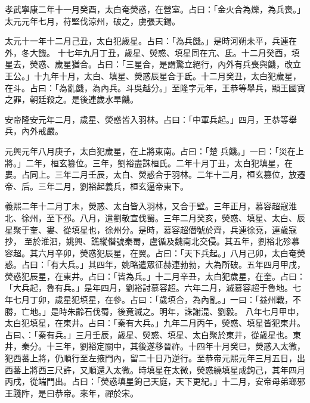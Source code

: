 \begin{pinyinscope}
 孝武寧康二年十一月癸酉，太白奄熒惑，在營室。占曰：「金火合為爍，為兵喪。」太元元年七月，苻堅伐涼州，破之，虜張天錫。



 太元十一年十二月己丑，太白犯歲星。占曰：「為兵饑。」是時河朔未平，兵連在外，冬大饑。
 十七年九月丁丑，歲星、熒惑、填星同在亢、氐。十二月癸酉，填星去，熒惑、歲星猶合。占曰：「三星合，是謂驚立絕行，內外有兵喪與饑，改立王公。」十九年十月，太白、填星、熒惑辰星合于氐。十二月癸丑，太白犯歲星，在斗。占曰：「為亂饑，為內兵。斗吳越分。」至隆字元年，王恭等舉兵，顯王國寶之罪，朝廷殺之。是後連歲水旱饑。



 安帝隆安元年二月，歲星、熒惑皆入羽林。占曰：「中軍兵起。」四月，王恭等舉兵，內外戒嚴。



 元興元年八月庚子，太白犯歲星，在上將東南。占曰：「楚
 兵饑。」一曰：「災在上將。」二年，桓玄篡位。三年，劉裕盡誅桓氏。二年十月丁丑，太白犯填星，在婁。占同上。三年二月壬辰，太白、熒惑合于羽林。二年十二月，桓玄篡位，放遷帝、后。三年二月，劉裕起義兵，桓玄逼帝東下。



 義熙二年十二月丁未，熒惑、太白皆入羽林，又合于壁。三年正月，慕容超寇淮北、徐州，至下邳。八月，遣劉敬宣伐蜀。三年二月癸亥，熒惑、填星、太白、辰星聚于奎、婁、從填星也，徐州分。是時，慕容超僭號於齊，兵連徐兗，連歲寇抄，
 至於淮泗，姚興、譙縱僭號秦蜀，盧循及魏南北交侵。其五年，劉裕北殄慕容超。其六月辛卯，熒惑犯辰星，在翼。占曰：「天下兵起。」八月己卯，太白奄熒惑。占曰：「有大兵。」其四年，姚略遣眾征赫連勃勃，大為所破。五年四月甲戌，熒惑犯辰星，在東井。占曰：「皆為兵。」十二月辛丑，太白犯歲星，在奎。占曰：「大兵起，魯有兵。」是年四月，劉裕討慕容超。六年二月，滅慕容超于魯地。七年七月丁卯，歲星犯填星，在參。占曰：「歲填合，為內亂。」一曰：「益州戰，不勝，亡地。」是時朱齡石伐蜀，後竟滅之。明年，誅謝混、劉毅。
 八年七月甲申，太白犯填星，在東井。占曰：「秦有大兵。」九年二月丙午，熒惑、填星皆犯東井。占曰、：「秦有兵。」三月壬辰，歲星、熒惑、填星、太白聚於東井，從歲星也。東井，秦分。十三年，劉裕定關中，其後遂移晉祚。十四年十月癸巳，熒惑入太微，犯西蕃上將，仍順行至左掖門內，留二十日乃逆行。至恭帝元熙元年三月五日，出西蕃上將西三尺許，又順還入太微。時填星在太微，熒惑繞填星成鉤己，其年四月丙戌，從端門出。占曰：「熒惑填星鉤己天庭，天下更紀。」十二月，安帝母弟瑯邪王踐阼，是曰恭帝。來年，禪於宋。



\end{pinyinscope}